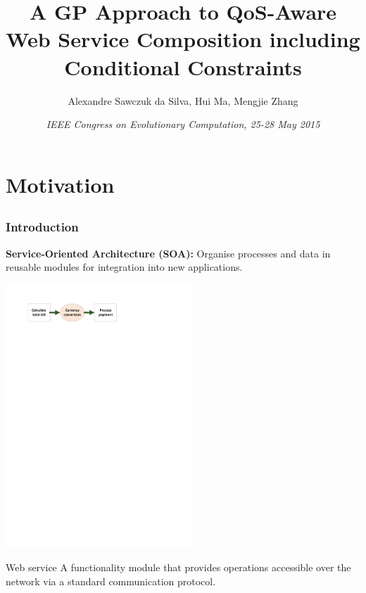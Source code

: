 \documentclass{beamer}
\title[A GP Approach to QoS-Aware Web Service Composition including Conditional Constraints]{A GP Approach to QoS-Aware Web Service Composition including Conditional Constraints} %
\author{Alexandre Sawczuk da Silva, Hui Ma, Mengjie Zhang} %
\institute[Victoria University of Wellington] %
{
\textbf{Evolutionary Computation Research Group}\\
School of Engineering and Computer Science, Victoria University of Wellington \\ %
}
\date{\footnotesize \textit{IEEE Congress on Evolutionary Computation, 25-28 May 2015}}
\begin{document}
\begin{frame}
\titlepage %
\end{frame}



\section{Motivation} %
\subsection{} %

\begin{frame}
\frametitle{Introduction}
\textbf{Service-Oriented Architecture (SOA):} Organise processes and data in reusable modules for integration into new applications.
\vfill
\centerline{\includegraphics[width=7cm]{currency_example.pdf}}
\vfill
\begin{block}{Web service}
A functionality module that provides operations accessible over the network via a standard communication protocol.
\end{block}
\end{frame}
\end{document}
